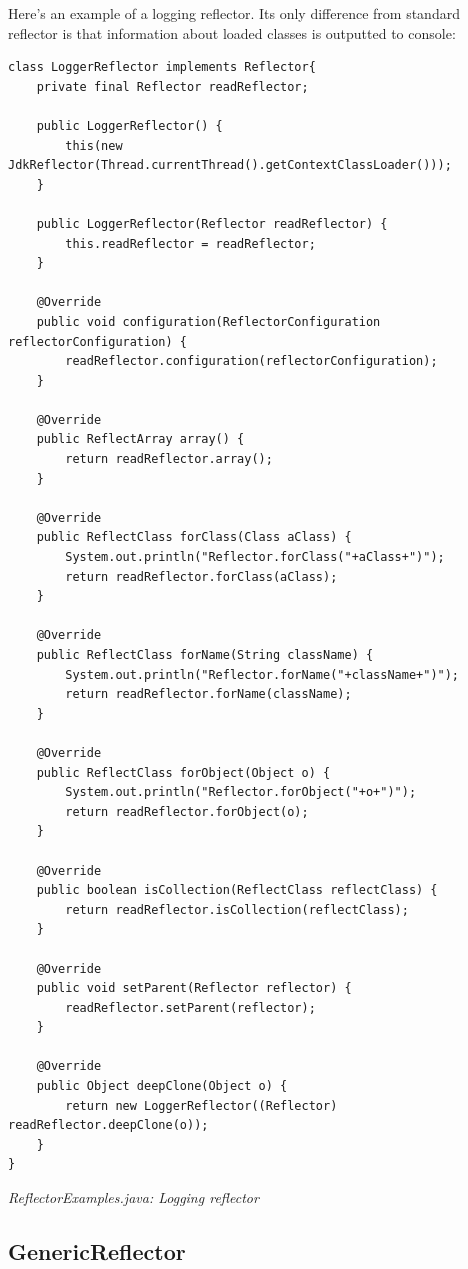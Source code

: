 Here's an example of a logging reflector. Its only difference from standard reflector is that information about loaded classes is outputted to console:

\begin{lstlisting}
class LoggerReflector implements Reflector{
    private final Reflector readReflector;

    public LoggerReflector() {
        this(new JdkReflector(Thread.currentThread().getContextClassLoader()));
    }

    public LoggerReflector(Reflector readReflector) {
        this.readReflector = readReflector;
    }

    @Override
    public void configuration(ReflectorConfiguration reflectorConfiguration) {
        readReflector.configuration(reflectorConfiguration);
    }

    @Override
    public ReflectArray array() {
        return readReflector.array();
    }

    @Override
    public ReflectClass forClass(Class aClass) {
        System.out.println("Reflector.forClass("+aClass+")");
        return readReflector.forClass(aClass);
    }

    @Override
    public ReflectClass forName(String className) {
        System.out.println("Reflector.forName("+className+")");
        return readReflector.forName(className);
    }

    @Override
    public ReflectClass forObject(Object o) {
        System.out.println("Reflector.forObject("+o+")");
        return readReflector.forObject(o);
    }

    @Override
    public boolean isCollection(ReflectClass reflectClass) {
        return readReflector.isCollection(reflectClass);
    }

    @Override
    public void setParent(Reflector reflector) {
        readReflector.setParent(reflector);
    }

    @Override
    public Object deepClone(Object o) {
        return new LoggerReflector((Reflector) readReflector.deepClone(o));
    }
}
\end{lstlisting}

{\small\itshape ReflectorExamples.java: Logging reflector\par}
\medskip

\subsection{GenericReflector}
\label{ref:advanced-topics-db4o-reflection-api-genericreflector}

